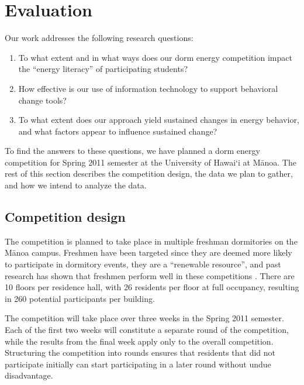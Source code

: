 
\section{Evaluation}
\label{sec:evaluation}

Our work addresses the following research questions:

\begin{enumerate}
	\item To what extent and in what ways does our dorm energy competition impact the ``energy literacy'' of participating students?
	\item How effective is our use of information technology to support behavioral change tools?
	\item To what extent does our approach yield sustained changes in energy behavior, and what factors appear to influence sustained change?
\end{enumerate}

To find the answers to these questions, we have planned a dorm energy competition for Spring 2011 semester at the University of Hawai`i at M\=anoa. The rest of this section describes the competition design, the data we plan to gather, and how we intend to analyze the data.

\subsection{Competition design}

The competition is planned to take place in multiple freshman dormitories on the M\=anoa campus. Freshmen have been targeted since they are deemed more likely to participate in dormitory events, they are a ``renewable resource'', and past research has shown that freshmen perform well in these competitions \cite{petersen-dorm-energy-reduction}. There are 10 floors per residence hall, with 26 residents per floor at full occupancy, resulting in 260 potential participants per building.

The competition will take place over three weeks in the Spring 2011 semester. Each of the first two weeks will constitute a separate round of the competition, while the results from the final week apply only to the overall competition. Structuring the competition into rounds ensures that residents that did not participate initially can start participating in a later round without undue disadvantage.

